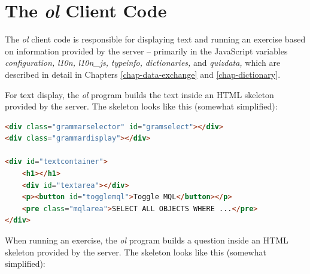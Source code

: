 \documentclass[11pt,oneside,a4paper]{memoir}
\begin{document}
\section{The \emph{ol} Client Code}\label{sec-ol}

The \emph{ol} client code is responsible for displaying text and running an exercise based on
information provided by the server -- primarily in the JavaScript variables \emph{configuration,}%
\emph{l10n,}%
\emph{l10n\_js,}%
\emph{typeinfo,}%
\emph{dictionaries,}%
and \emph{quizdata,}%
which are described in detail in Chapters \ref{chap-data-exchange} and \ref{chap-dictionary}.

For text display, the \emph{ol} program builds the text inside an HTML skeleton provided by the
server. The skeleton looks like this (somewhat simplified):


\begin{lstlisting}[language=HTML]
<div class="grammarselector" id="gramselect"></div>
<div class="grammardisplay"></div>

<div id="textcontainer">
    <h1></h1>
    <div id="textarea"></div>
    <p><button id="togglemql">Toggle MQL</button></p>
    <pre class="mqlarea">SELECT ALL OBJECTS WHERE ...</pre>
</div>
\end{lstlisting}

When running an exercise, the \emph{ol} program builds a question inside an HTML skeleton provided by the
server. The skeleton looks like this (somewhat simplified):
\end{document}
